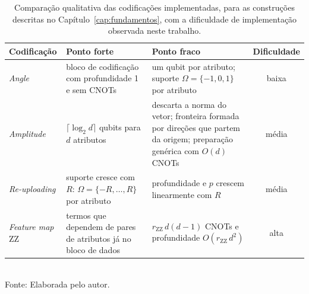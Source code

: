 \begin{table}[htb]
\centering
\caption[Comparação qualitativa das codificações implementadas]{Comparação qualitativa das codificações implementadas, para as construções descritas no Capítulo~\ref{cap:fundamentos}, com a dificuldade de implementação observada neste trabalho.}
\label{tab:qualitativa}
\begin{tabular}{lp{4.2cm}p{4.2cm}c}
\toprule
Codificação & Ponto forte & Ponto fraco & Dificuldade \\
\midrule
\textit{Angle} & bloco de codificação com profundidade 1 e sem CNOTs & um qubit por atributo; suporte $\Omega = \{-1,0,1\}$ por atributo & baixa \\
\textit{Amplitude} & $\lceil \log_2 d \rceil$ qubits para $d$ atributos & descarta a norma do vetor; fronteira formada por direções que partem da origem; preparação genérica com $O(d)$ CNOTs & média \\
\textit{Re-uploading} & suporte cresce com $R$: $\Omega = \{-R,\dots,R\}$ por atributo & profundidade e $p$ crescem linearmente com $R$ & média \\
\textit{Feature map} ZZ & termos que dependem de pares de atributos já no bloco de dados & $r_{\mathrm{ZZ}}\,d(d-1)$ CNOTs e profundidade $O(r_{\mathrm{ZZ}}\,d^2)$ & alta \\
\bottomrule
\end{tabular}
\\[2pt]
{\footnotesize Fonte: Elaborada pelo autor.}
\end{table}
